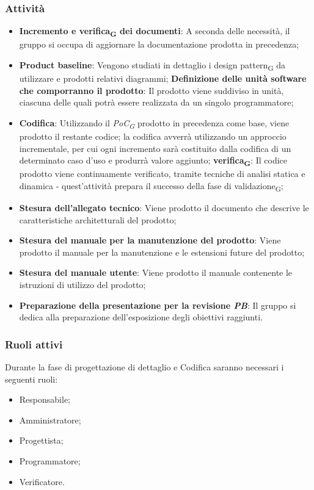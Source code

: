 \subsubsection{Attività}\:
\begin{itemize}
    \item \textbf{Incremento e verifica\textsubscript{G} dei documenti}: A seconda delle necessità, il gruppo si occupa di aggiornare la documentazione prodotta in precedenza;
    \item \textbf{Product baseline}: Vengono studiati in dettaglio i design pattern\textsubscript{G} da utilizzare e prodotti relativi diagrammi;
        \subitem \textbf{Definizione delle unità software che comporranno il prodotto}: Il prodotto viene suddiviso in unità, ciascuna delle quali potrà essere realizzata da un singolo programmatore;
    \item \textbf{Codifica}: Utilizzando il \textit{PoC\textsubscript{G}} prodotto in precedenza come base, viene prodotto il restante codice; la codifica avverrà utilizzando un approccio incrementale, per cui ogni incremento sarà costituito dalla codifica di un determinato caso d’uso e produrrà valore aggiunto;
        \subitem \textbf{verifica\textsubscript{G}}: Il codice prodotto viene continuamente verificato, tramite tecniche di analisi statica e dinamica - quest’attività prepara il successo della fase di validazione\textsubscript{G};
    \item \textbf{Stesura dell’allegato tecnico}: Viene prodotto il documento che descrive le caratteristiche architetturali del prodotto;
    \item \textbf{Stesura del manuale per la manutenzione del prodotto}: Viene prodotto il manuale per la manutenzione e le estensioni future del prodotto;
    \item \textbf{Stesura del manuale utente}: Viene prodotto il manuale contenente le istruzioni di utilizzo del prodotto;
    \item \textbf{Preparazione della presentazione per la revisione \textit{PB}}: Il gruppo si dedica alla preparazione dell’esposizione degli obiettivi raggiunti.
\end{itemize}

\subsubsection{Ruoli attivi}
Durante la fase di progettazione di dettaglio e Codifica saranno necessari i seguenti ruoli:
\begin{itemize}
	\item Responsabile;
    \item Amministratore;
    \item Progettista;
    \item Programmatore;
    \item Verificatore.
\end{itemize}

